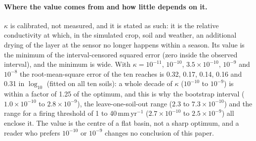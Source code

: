 \documentclass[preprint,12pt,authoryear]{elsarticle}
\begin{document}
\paragraph{Where the value comes from and how little depends on it.}
$\kappa$ is calibrated, not measured, and it is stated as such: it is the relative conductivity at which, in the simulated crop, soil and weather, an additional drying of the layer at the sensor no longer happens within a season. Its value is the minimum of the interval-censored squared error (zero inside the observed interval), and the minimum is wide. With $\kappa=10^{-11}$, $10^{-10}$, $3.5\times10^{-10}$, $10^{-9}$ and $10^{-8}$ the root-mean-square error of the ten reaches is 0.32, 0.17, 0.14, 0.16 and 0.31 in $\log_{10}$ (fitted on all ten soils): a whole decade of $\kappa$ ($10^{-10}$ to $10^{-9}$) is within a factor of 1.25 of the optimum, and this is why the bootstrap interval ($1.0\times10^{-10}$ to $2.8\times10^{-9}$), the leave-one-soil-out range ($2.3$ to $7.3\times10^{-10}$) and the range for a firing threshold of 1 to 40\,mm\,yr$^{-1}$ ($2.7\times10^{-10}$ to $2.5\times10^{-9}$) all enclose it. The value is the centre of a flat basin, not a sharp optimum, and a reader who prefers $10^{-10}$ or $10^{-9}$ changes no conclusion of this paper.
\end{document}
